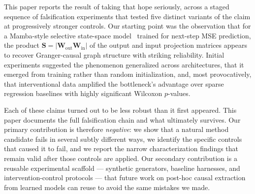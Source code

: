 \documentclass{article}
\begin{document}
This paper reports the result of taking that hope seriously, across
a staged sequence of falsification experiments that tested five
distinct variants of the claim at progressively stronger controls. Our starting point was the
observation that for a Mamba-style selective state-space
model~\citep{gu2023mamba} trained for next-step MSE prediction, the
product $\mathbf{S} = |\mathbf{W}_{\text{out}}
\mathbf{W}_{\text{in}}|$ of the output and input projection matrices
appears to recover Granger-causal graph structure with striking
reliability. Initial experiments suggested the phenomenon generalized
across architectures, that it emerged from training rather than
random initialization, and, most provocatively, that interventional
data amplified the bottleneck's advantage over sparse regression
baselines with highly significant Wilcoxon $p$-values.

Each of these claims turned out to be less robust than it first
appeared. This paper documents the full falsification chain and what
ultimately survives. Our primary contribution is therefore
\emph{negative}: we show that a natural method candidate fails in
several subtly different ways, we identify the
specific controls that caused it to fail, and we report the narrow
characterization findings that remain valid after those controls are
applied. Our secondary contribution is a reusable experimental
scaffold — synthetic generators, baseline harnesses, and
intervention-control protocols — that future work on post-hoc causal
extraction from learned models can reuse to avoid the same mistakes
we made.
\end{document}
